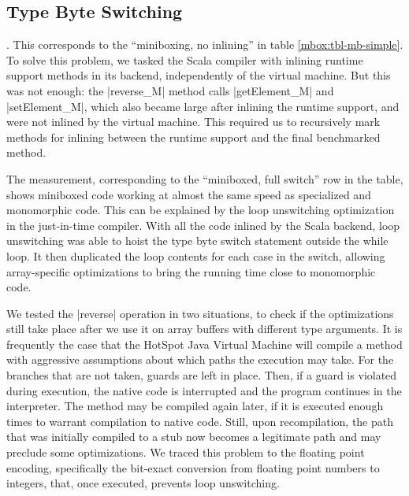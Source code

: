 \subsection{Type Byte Switching}
\label{mbox:subsec-mb-switching}

. This corresponds to the ``miniboxing, no inlining'' in table \ref{mbox:tbl-mb-simple}. To solve this problem, we tasked the Scala compiler with inlining runtime support methods in its backend, independently of the virtual machine. But this was not enough: the |reverse_M| method calls |getElement_M| and |setElement_M|, which also became large after inlining the runtime support, and were not inlined by the virtual machine. This required us to recursively mark methods for inlining between the runtime support and the final benchmarked method.

 The measurement, corresponding to the ``miniboxed, full switch'' row in the table, shows miniboxed code working at almost the same speed as specialized and monomorphic code. This can be explained by the  loop unswitching optimization in the just-in-time compiler. With all the code inlined by the Scala backend, loop unswitching was able to hoist the type byte switch statement outside the while loop. It then duplicated the loop contents for each case in the switch, allowing array-specific optimizations to bring the running time close to monomorphic code.

 We tested the |reverse| operation in two situations, to check if the optimizations still take place after we use it on array buffers with different type arguments. It is frequently the case that the HotSpot Java Virtual Machine will compile a method with aggressive assumptions about which paths the execution may take. For the branches that are not taken, guards are left in place. Then, if a guard is violated during execution, the native code is interrupted and the program continues in the interpreter. The method may be compiled again later, if it is executed enough times to warrant compilation to native code. Still, upon recompilation, the path that was initially compiled to a stub now becomes a legitimate path and may preclude some optimizations. We traced this problem to the floating point encoding, specifically the bit-exact conversion from floating point numbers to integers, that, once executed, prevents loop unswitching.     

